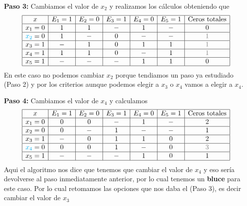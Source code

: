 \begin{sol}
\textbf{Paso 3:} Cambiamos el valor de $x_2$ y realizamos los cálculos obteniendo que 
$$
\begin{array}{|c|c|c|c|c|c|c|c|}
\hline
x & E_1=1 & E_2=0 & E_3=1 & E_4=0 & E_5=1 & \text{Ceros totales}\\
\hline
x_1= 0& 1 & 1& - & 1& - &0\\
\hline
\textcolor{cyan}{x_2}=0& 1&-& 0&- &-&\textcolor{gray}{1}\\
\hline
x_3=1&-&1&0&1&1&\textcolor{gray}{1}\\
\hline
x_4=1& 1&1&0&-&1&\textcolor{gray}{1}\\
\hline
x_5=1&-&-&-&1&1&0\\
\hline
\end{array}
$$
En este caso no podemos cambiar $x_2$ porque tendiamos un paso ya estudiado (Paso 2) y por los criterios aunque podemos elegir a $x_3$ o $x_4$ vamos a elegir a $x_4$.

\textbf{Paso 4:} Cambiamos el valor de $x_4$ y calculamos 
$$
\begin{array}{|c|c|c|c|c|c|c|c|}
\hline
x & E_1=1 & E_2=0 & E_3=1 & E_4=0 & E_5=1 & \text{Ceros totales}\\
\hline
x_1= 0& 0 & 0& - & 1& - &2\\
\hline
x_2=0& 0&-& 1&- &-&1\\
\hline
x_3=1&-&0&1&1&0&2\\
\hline
\textcolor{cyan}{x_4}=0& 0&0&1&-&0&\textcolor{gray}{3}\\
\hline
x_5=1&-&-&-&1&0&1\\
\hline
\end{array}
$$
Aqui el algoritmo nos dice que tenemos que cambiar el valor de $x_4$ y eso sería devolverse al paso inmediatamente anterior, por lo cual tenemos un \textbf{bluce} para este caso.
Por lo cual retomamos las opciones que nos daba el (Paso 3), es decir cambiar el valor de $x_3$


\end{sol}
